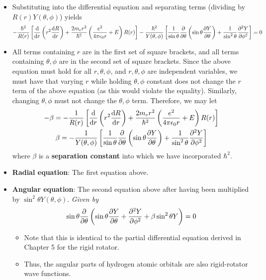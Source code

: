 \documentclass[../notes.tex]{subfiles}
\begin{document}
\begin{itemize}
    \item Substituting into the differential equation and separating terms (dividing by $R(r)Y(\theta,\phi)$) yields
    \begin{equation*}
        -\frac{\hbar^2}{R(r)}\left[ \dv{r}\left( r^2\dv{R}{r} \right)+\frac{2m_er^2}{\hbar^2}\left( \frac{e^2}{4\pi\epsilon_0r}+E \right)R(r) \right]-\frac{\hbar^2}{Y(\theta,\phi)}\left[ \frac{1}{\sin\theta}\pdv{\theta}\left( \sin\theta\pdv{Y}{\theta} \right)+\frac{1}{\sin^2\theta}\pdv[2]{Y}{\phi} \right] = 0
    \end{equation*}
    \item All terms containing $r$ are in the first set of square brackets, and all terms containing $\theta,\phi$ are in the second set of square brackets. Since the above equation must hold for all $r,\theta,\phi$, and $r,\theta,\phi$ are independent variables, we must have that varying $r$ while holding $\theta,\phi$ constant does not change the $r$ term of the above equation (as this would violate the equality). Similarly, changing $\theta,\phi$ must not change the $\theta,\phi$ term. Therefore, we may let
    \begin{gather*}
        -\beta = -\frac{1}{R(r)}\left[ \dv{r}\left( r^2\dv{R}{r} \right)+\frac{2m_er^2}{\hbar^2}\left( \frac{e^2}{4\pi\epsilon_0r}+E \right)R(r) \right]\\
        \beta = -\frac{1}{Y(\theta,\phi)}\left[ \frac{1}{\sin\theta}\pdv{\theta}\left( \sin\theta\pdv{Y}{\theta} \right)+\frac{1}{\sin^2\theta}\pdv[2]{Y}{\phi} \right]
    \end{gather*}
    where $\beta$ is a \textbf{separation constant} into which we have incorporated $\hbar^2$.
    \item \textbf{Radial equation}: The first equation above.
    \item \textbf{Angular equation}: The second equation above after having been multiplied by $\sin^2\theta Y(\theta,\phi)$. \emph{Given by}
    \begin{equation*}
        \sin\theta\pdv{\theta}\left( \sin\theta\pdv{Y}{\theta}+\pdv[2]{Y}{\phi}+\beta\sin^2\theta Y \right) = 0
    \end{equation*}
    \begin{itemize}
        \item Note that this is identical to the partial differential equation derived in Chapter 5 for the rigid rotator.
        \item Thus, the angular parts of hydrogen atomic orbitals are also rigid-rotator wave functions.

\end{itemize}
\end{itemize}
\end{document}
